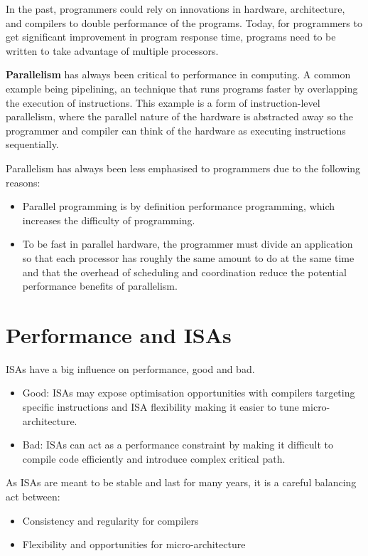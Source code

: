 \documentclass[10pt,a4paper]{article}
\begin{document}
In the past, programmers could rely on innovations in hardware, architecture, and compilers to
double performance of the programs. Today, for programmers to get significant improvement in program
response time, programs need to be written to take advantage of multiple processors. 

\textbf{Parallelism} has always been critical to performance in computing. A common example being
pipelining, an technique that runs programs faster by overlapping the execution of instructions.
This example is a form of instruction-level parallelism, where the parallel nature of the hardware
is abstracted  away so the programmer and compiler can think of the hardware as executing
instructions sequentially. 

Parallelism has always been less emphasised to programmers due to the following reasons:
\begin{itemize}
    \item Parallel programming is by definition performance programming, which increases the difficulty of programming.
    \item To be fast in parallel hardware, the programmer must divide an application so that each
    processor has roughly the same amount to do at the same time and that the overhead of scheduling
    and coordination reduce the potential performance benefits of parallelism. 
\end{itemize}

\pagebreak

\section{Performance and ISAs}

ISAs have a big influence on performance, good and bad.
\begin{itemize}
    \item Good: ISAs may expose optimisation opportunities with compilers targeting specific
    instructions and ISA flexibility making it easier to tune micro-architecture.
    \item Bad: ISAs can act as a performance constraint by making it difficult to compile code efficiently
    and introduce complex critical path.
\end{itemize} 

As ISAs are meant to be stable and last for many years, it is a careful balancing act between:
\begin{itemize}
    \item Consistency and regularity for compilers
    \item Flexibility and opportunities for micro-architecture
\end{itemize}
\end{document}
